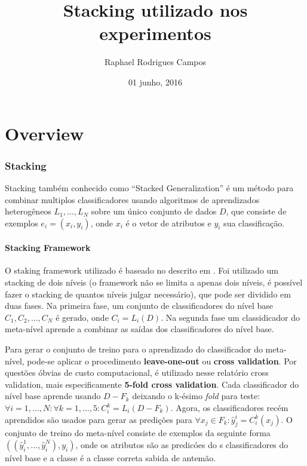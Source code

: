 \documentclass[]{article}
\title{Stacking utilizado nos experimentos}
\author{Raphael Rodrigues Campos}
\date{01 junho, 2016}
\begin{document}
\maketitle


\chapter{Overview}

\subsection{Stacking}\label{stacking}

Stacking também conhecido como ``Stacked Generalization'' é um método
para combinar multiplos classificadores usando algoritmos de
aprendizados heterogêneos \(L_1, ..., L_N\) sobre um único conjunto de
dados \(D\), que consiste de exemplos \(e_i = (x_i, y_i)\), onde \(x_i\)
é o vetor de atributos e \(y_i\) sua classificação.

\subsubsection{Stacking Framework}\label{stacking-framework}

O staking framework utilizado é baseado no descrito em
\citep{Wolpert92stackedgeneralization}. Foi utilizado um stacking de
dois níveis (o framework não se limita a apenas dois níveis, é possível
fazer o stacking de quantos níveis julgar necessário), que pode ser
dividido em duas fases. Na primeira fase, um conjunto de classificadores
do nível base \(C_1, C_2, ..., C_N\) é gerado, onde \(C_i = L_i(D)\). Na
segunda fase um classidicador do meta-nível aprende a combinar as saídas
dos classificadores do nível base.

Para gerar o conjunto de treino para o aprendizado do classificador do
meta-nível, pode-se aplicar o procedimento \textbf{leave-one-out} ou
\textbf{cross validation}. Por questões óbvias de custo computacional, é
utilizado nesse relatório cross validation, mais especificamente
\textbf{5-fold cross validation}. Cada classificador do nível base
aprende usando \(D - F_k\) deixando o k-ésimo \emph{fold} para teste:
\(\forall i = 1,...,N : \forall k = 1,...,5 : C^{k}_i = L_i(D-F_k)\).
Agora, os classificadores recém aprendidos são usados para gerar as
predições para \(\forall x_j \in F_k:\hat{y}_j^i=C^k_i(x_j)\). O
conjunto de treino do meta-nível consiste de exemplos da seguinte forma
\(((\hat{y}_i^1,..., \hat{y}_i^N), y_i)\), onde os atributos são as
predicóes do s classificadores do nível base e a classe é a classe
correta sabida de antemão.
\end{document}
